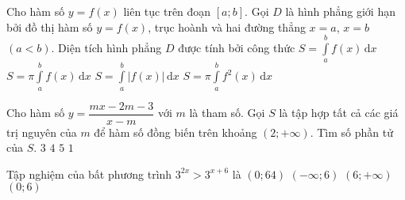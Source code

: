 \begin{ex}%
Cho hàm số $y=f(x)$ liên tục trên đoạn $\left[a;b\right]$. Gọi $D$ là hình phẳng giới hạn bởi đồ thị hàm số $y=f(x)$, trục hoành và hai đường thẳng $x=a$, $x=b$ $(a<b)$. Diện tích hình phẳng $D$ được tính bởi công thức
\choice
{$S=\displaystyle\int\limits_a^b f(x)\mathrm{\,d}x$}
{$S=\pi\displaystyle\int\limits_a^b f(x)\mathrm{\,d}x$}
{\True $S=\displaystyle\int\limits_a^b\left| f(x)\right|\mathrm{\,d}x$}
{$S=\pi\displaystyle\int\limits_a^b f^2(x)\mathrm{\,d}x$}
\end{ex}

\begin{ex}%
Cho hàm số $y=\dfrac{mx-2m-3}{x-m}$ với $m$ là tham số. Gọi $S$ là tập hợp tất cả các giá trị nguyên của $m$ để hàm số đồng biến trên khoảng $\left(2;+\infty\right)$. Tìm số phần tử của $S$.
\choice
{\True $3$}
{$4$}
{$5$}
{$1$}
\end{ex}

\begin{ex}%
Tập nghiệm của bất phương trình $3^{2x}>3^{x+6}$ là
\choice
{$(0;64)$}
{$(-\infty;6)$}
{\True $(6;+\infty)$}
{$(0;6)$}
\end{ex}

